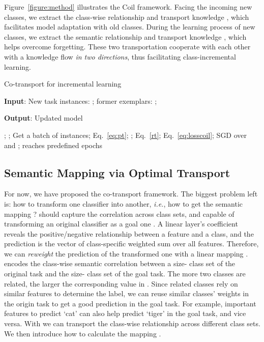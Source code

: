 \documentclass[sigconf]{acmart}
\newcommand{\ie}{\emph{i.e.}}
\newcommand{\name}{{\sc Coil }}
\begin{document}
 Figure~\ref{figure:method} illustrates the \name framework. Facing the incoming new classes, we extract the class-wise relationship and transport knowledge  , which facilitates model adaptation with old classes. During the learning process of new classes, we extract the semantic relationship and transport knowledge  , which helps overcome forgetting. These two transportation cooperate with each other with a knowledge flow \emph{in two directions}, thus  facilitating class-incremental learning. 


{\begin{algorithm}[t]
		\caption{ Co-transport for incremental learning }
		\label{alg:coil}
		\raggedright
		{\bf Input}: New task instances: ; former exemplars: ;
		
		{\bf Output}: Updated model 
		\begin{algorithmic}[1]
			\State ; 
			\State ; 
			\Repeat
			\State Get a batch of instances;
			\State Eq.~\ref{eq:pt}; 
			\State ;
			\State Eq.~\ref{rt}; 
			\State  Eq.~\ref{eq:losscoil};
			\State SGD over  and ;
			\Until reaches predefined epochs
		\end{algorithmic} 
\end{algorithm}}

\subsection{Semantic Mapping via Optimal Transport}
For now, we have proposed the co-transport framework. The biggest problem left is: how to transform one classifier into another, \ie, how to get the semantic mapping ?
 should capture the correlation across class sets, and capable of transforming an {original} classifier  as a goal one . 
A linear layer's coefficient reveals the positive/negative relationship between a feature and a class, and the prediction  is the vector of class-specific weighted sum over all features. 
Therefore, we can \emph{reweight} the prediction of the transformed one with a linear mapping .  encodes the class-wise semantic correlation between a size- class set of the original  task and the size- class set of the goal task. The more two classes are related, the larger the corresponding value in . Since related classes rely on similar features to determine the label, we can reuse similar classes' weights in the origin task to get a good prediction in the goal task. For example, important features to predict `cat' can also help predict `tiger' in the goal task, and vice versa. With  we can transport the class-wise relationship across different class sets. We then introduce how to calculate the mapping .
\end{document}
